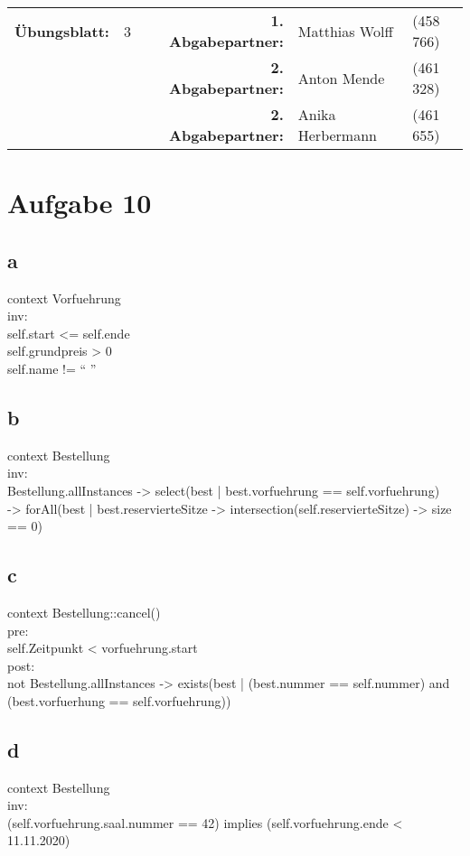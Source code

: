\newcommand{\obenlinks}{Software Engineering}		%



	\begin{center}
		\begin{tabular}{|rlp{4cm}rll|}
		\hline
		 \textbf{Übungsblatt:} & 3 &   & \textbf{1. Abgabepartner:} & Matthias Wolff & (458 766)  \\
		        & & & \textbf{2. Abgabepartner:} & Anton Mende & (461 328) \\
		        & & & \textbf{2. Abgabepartner:} & Anika Herbermann & (461 655) \\ \hline
		\end{tabular}
	\end{center}
\section*{Aufgabe 10}
\subsection*{a}
context Vorfuehrung\\ \indent
\quad inv:\\ \indent
\qquad self.start <= self.ende\\ \indent
\qquad self.grundpreis > 0\\ \indent
\qquad self.name !=  \enquote{ }

\subsection*{b}
context Bestellung \\ \indent
\quad inv: \\ \indent
\qquad Bestellung.allInstances -> select(best | best.vorfuehrung == self.vorfuehrung)\\ \indent \qquad -> forAll(best | best.reservierteSitze -> intersection(self.reservierteSitze) -> size == 0)
\subsection*{c}
context Bestellung::cancel()\\ \indent
\quad pre:\\ \indent
\qquad self.Zeitpunkt < vorfuehrung.start\\ \indent
\quad post: \\ \indent
\qquad not \quad Bestellung.allInstances -> exists(best | (best.nummer == self.nummer) and (best.vorfuerhung == self.vorfuehrung))

\subsection*{d}
context Bestellung\\ \indent
\quad inv: \\ \indent
\qquad  (self.vorfuehrung.saal.nummer == 42) implies (self.vorfuehrung.ende < 11.11.2020)

